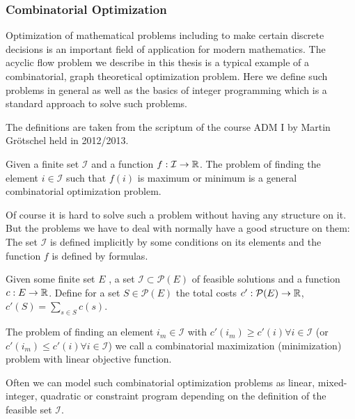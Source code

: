 
\subsubsection{Combinatorial Optimization}
Optimization of mathematical problems including to make certain discrete decisions is an important field of application 
for modern mathematics. The acyclic flow problem we describe in this thesis is a typical example of a combinatorial, 
graph theoretical optimization problem. Here we define such problems in general as well as the basics of integer 
programming which is a standard approach to solve such problems. 

The definitions are taken from the scriptum of the course ADM I by Martin Gr\"otschel held in 2012/2013. %

\begin{definition}
 Given a finite set $\mathcal{I}$ and a function $f:\mathcal{I}\to\mathbb{R}$. The problem of finding the element 
$i\in\mathcal{I}$ such that $f(i)$ is maximum or minimum is a general combinatorial optimization problem.
\end{definition}
Of course it is hard to solve such a problem without having any structure on it. But the problems we have to deal with 
normally have  a good structure on them: The set $\mathcal{I}$ is defined implicitly by some conditions on its elements 
and the function $f$ is defined by formulas.

\begin{definition}
 Given some finite set $E$ , a set $\mathcal{I}\subset \mathcal{P}(E)$ of feasible solutions and a function 
 $c:E\to \mathbb{R}$. Define for a set $S \in \mathcal{P}(E)$ the total costs $c':\mathcal{P}(E)\to \mathbb{R}$, 
 $c'(S)=\sum_{s\in S}c(s)$. 
 
 The problem of finding an element $i_m\in\mathcal{I}$ with $c'(i_m)\ge c'(i)\forall 
 i\in\mathcal{I} $ (or $c'(i_m)\le c'(i)\forall i\in\mathcal{I} $) we call a combinatorial maximization (minimization) 
 problem with linear objective function.
\end{definition}

Often we can model such combinatorial optimization problems as linear, mixed-integer, quadratic or constraint program 
depending on the definition of the feasible set $\mathcal{I}$. 

